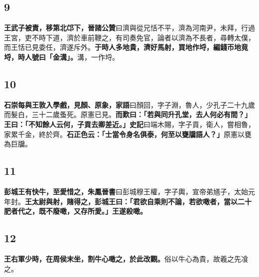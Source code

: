 \subsection*{9}

\textbf{王武子被責，移第北邙下，}{\footnotesize \textbf{晉諸公贊}曰濟與從兄恬不平，濟為河南尹，未拜，行過王宮，吏不時下道，濟於車前鞭之，有司奏免官，論者以濟為不長者，尋轉太僕，而王恬已見委任，濟遂斥外。}\textbf{于時人多地貴，濟好馬射，買地作埒，編錢帀地竟埒，時人號曰「金溝」。}{\footnotesize 溝，一作埒。}

\subsection*{10}

\textbf{石崇每與王敦入學戲，見顏、原象，}{\footnotesize \textbf{家語}曰顏回，字子淵，魯人，少孔子二十九歲而髮白，三十二歲蚤死。原憲已見。}\textbf{而歎曰：「若與同升孔堂，去人何必有間？」王曰：「不知餘人云何，子貢去卿差近。」}{\footnotesize \textbf{史記}曰端木賜，字子貢，衛人，嘗相魯，家累千金，終於齊。}\textbf{石正色云：「士當令身名俱泰，何至以甕牖語人？」}{\footnotesize 原憲以甕為巨牖。}

\subsection*{11}

\textbf{彭城王有快牛，至愛惜之，}{\footnotesize \textbf{朱鳳晉書}曰彭城穆王權，字子輿，宣帝弟馗子，太始元年封。}\textbf{王太尉與射，賭得之，彭城王曰：「君欲自乘則不論，若欲噉者，當以二十肥者代之，既不廢噉，又存所愛。」王遂殺噉。}

\subsection*{12}

\textbf{王右軍少時，在周侯末坐，割牛心噉之，於此改觀。}{\footnotesize 俗以牛心為貴，故羲之先飡之。}